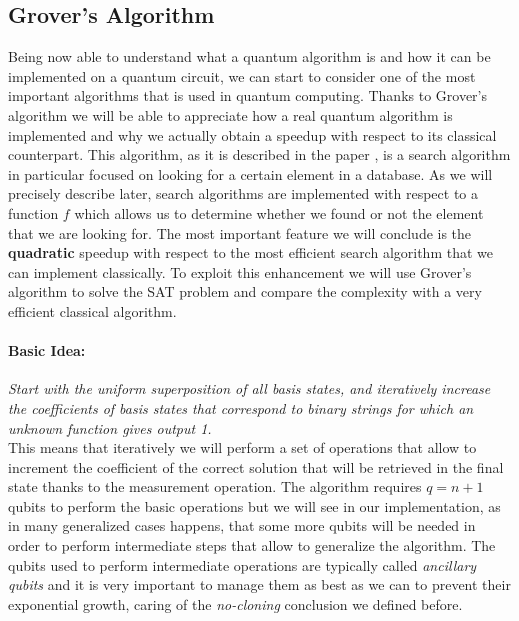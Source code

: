 \documentclass[english]{article}
\begin{document}
		\subsection{Grover's Algorithm}
		\label{sec:grover}
			Being now able to understand what a quantum algorithm is and how it can be implemented on a quantum circuit, we can start to consider one of the most important algorithms that is used in quantum computing. Thanks to Grover's algorithm we will be able to appreciate how a real quantum algorithm is implemented and why we actually obtain a speedup with respect to its classical counterpart. This algorithm, as it is described in the paper \cite[Lov K. Grover]{grover}, is a search algorithm in particular focused on looking for a certain element in a database. As we will precisely describe later, search algorithms are implemented with respect to a function $f$ which allows us to determine whether we found or not the element that we are looking for. The most important feature we will conclude is the \textbf{quadratic} speedup with respect to the most efficient search algorithm that we can implement classically. To exploit this enhancement we will use Grover's algorithm to solve the SAT problem and compare the complexity with a very efficient classical algorithm. 
			
			\paragraph{Basic Idea:} \emph{Start with the uniform superposition of all basis states, and iteratively increase the coefficients of basis states that correspond to binary strings for which an unknown function gives output 1.} \\
			
			This means that iteratively we will perform a set of operations that allow to increment the coefficient of the correct solution that will be retrieved in the final state thanks to the measurement operation. The algorithm requires $q = n + 1$ qubits to perform the basic operations but we will see in our implementation, as in many generalized cases happens, that some more qubits will be needed in order to perform intermediate steps that allow to generalize the algorithm. The qubits used to perform intermediate operations are typically called \emph{ancillary qubits} and it is very important to manage them as best as we can to prevent their exponential growth, caring of the \emph{no-cloning} conclusion we defined before.
			
\end{document}
